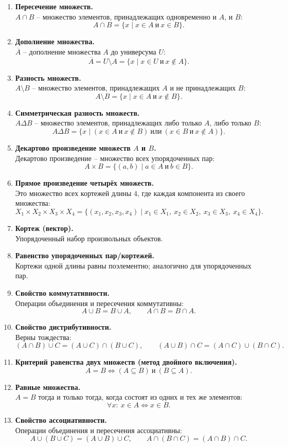 \documentclass[a4paper,12pt,oneside]{article}
\newcommand{\DefItem}[2]{\item \textbf{#1}\\#2}
\begin{document}
\begin{enumerate}[label=\arabic*.]
\DefItem{Пересечение множеств.}{$A \cap B$ – множество элементов, принадлежащих одновременно и $A$, и $B$:
\[
A \cap B = \{x \mid x \in A \ \text{и}\ x \in B\}.
\]}

\DefItem{Дополнение множества.}{$\overline{A}$ – дополнение множества $A$ до универсума $U$:
\[
\overline{A} = U \setminus A = \{x \mid x \in U \ \text{и}\ x \notin A\}.
\]}

\DefItem{Разность множеств.}{$A \setminus B$ – множество элементов, принадлежащих $A$ и не принадлежащих $B$:
\[
A \setminus B = \{x \mid x \in A \ \text{и}\ x \notin B\}.
\]}

\DefItem{Симметрическая разность множеств.}{$A \Delta B$ – множество элементов, принадлежащих либо только $A$, либо только $B$:
\[
A \Delta B = \{x \mid (x \in A \ \text{и}\ x \notin B)\ \text{или}\ (x \in B \ \text{и}\ x \notin A)\}.
\]}

\DefItem{Декартово произведение множеств $A$ и $B$.}{Декартово произведение – множество всех упорядоченных пар:
\[
A \times B = \{(a,b) \mid a \in A \ \text{и}\ b \in B\}.
\]}

\DefItem{Прямое произведение четырёх множеств.}{Это множество всех кортежей длины $4$, где каждая компонента из своего множества:
\[
X_1 \times X_2 \times X_3 \times X_4
=
\{(x_1,x_2,x_3,x_4)\mid x_1 \in X_1,\ x_2 \in X_2,\ x_3 \in X_3,\ x_4 \in X_4\}.
\]}

\DefItem{Кортеж (вектор).}{Упорядоченный набор произвольных объектов.}

\DefItem{Равенство упорядоченных пар/кортежей.}{Кортежи одной длины равны поэлементно; аналогично для упорядоченных пар.}

\DefItem{Свойство коммутативности.}{Операции объединения и пересечения коммутативны:
\[
A \cup B = B \cup A, \qquad A \cap B = B \cap A.
\]}

\DefItem{Свойство дистрибутивности.}{Верны тождества:
\[
(A \cap B) \cup C = (A \cup C)\cap(B \cup C),
\qquad
(A \cup B) \cap C = (A \cap C)\cup(B \cap C).
\]}

\DefItem{Критерий равенства двух множеств (метод двойного включения).}{
\[
A=B \iff (A \subseteq B)\ \text{и}\ (B \subseteq A).
\]}

\DefItem{Равные множества.}{$A = B$ тогда и только тогда, когда состоят из одних и тех же элементов:
\[
\forall x:\ x \in A \iff x \in B.
\]}

\DefItem{Свойство ассоциативности.}{Операции объединения и пересечения ассоциативны:
\[
A \cup (B \cup C) = (A \cup B) \cup C,
\qquad
A \cap (B \cap C) = (A \cap B) \cap C.
\]}


\end{enumerate}
\end{document}
